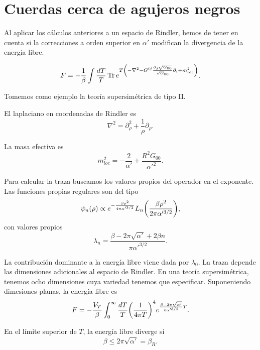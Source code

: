\section{Cuerdas cerca de agujeros negros}

Al aplicar los cálculos anteriores a un espacio de Rindler, hemos de tener en cuenta si la
correcciones a orden superior en $\alpha'$ modifican la divergencia de la energía libre.

\begin{equation}
  F=-\frac{1}{\beta}\int \frac{dT}{T} \Tr e^{T\qty(  -\nabla^2-G^{ij}\frac{\partial_j \sqrt{G_{00}}}{\sqrt G_{00}}\partial_i + m^2_{loc}) }.
\end{equation}

Tomemos como ejemplo la teoría supersimétrica de tipo II.

El laplaciano en coordenadas de Rindler es
\begin{equation}
  \nabla^2  = \partial_\rho^2 + \frac{1}{\rho}\partial_\rho.
\end{equation}

La masa efectiva es 
\begin{equation}
  m_{loc}^2=-\frac{2}{\alpha'}+\frac{R^2G_{00}}{\alpha'^2}.
\end{equation}


Para calcular la traza buscamos los valores propios del operador en el exponente.
Las funciones propias regulares son del tipo
\begin{equation}
  \psi_n(\rho)\propto e^{-\frac{\beta \rho^2}{4\pi\alpha'^{3/2}} }
  L_n\qty(\frac{\beta\rho^2}{2\pi\alpha'^{3/2}}),
\end{equation}
con valores propios
\begin{equation}
  \lambda_n=\frac{\beta-2\pi\sqrt{\alpha'}+2\beta n }{\pi\alpha'^{3/2}}.
\end{equation}

La contribución dominante a la energía libre viene dada por $\lambda_0$.
La traza depende las dimensiones adicionales al espacio de Rindler. 
En una teoría supersimétrica, tenemos ocho dimensiones cuya variedad tenemos que especificar.
Suponeniendo dimesiones planas, la energía libre es
\begin{equation}
  F= -\frac{V_T}{\beta}\int_0^\infty \frac{dT}{T}\qty(\frac{1}{4\pi T})^4 e^{\frac{\beta-2\pi\sqrt{\alpha'}}{\pi\alpha'^{3/2}}T}.
\end{equation}

En el límite superior de $T$, la energía libre diverge si
\begin{equation}
  \beta \leq 2\pi\sqrt{\alpha'}=\beta_R.
\end{equation}


